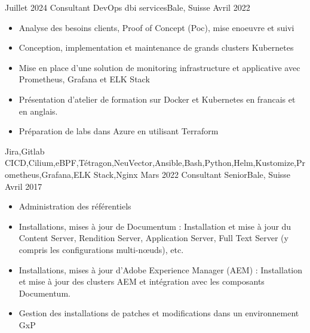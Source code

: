 %
%
%

\begin{experiences}
  \experience
    {Juillet 2024}   {Consultant DevOps }{dbi services}{Bale, Suisse}
    {Avril 2022} {
                      \begin{itemize}
                        \item Analyse des besoins clients, Proof of Concept (Poc), mise enoeuvre et suivi
                        \item Conception, implementation et maintenance de grands clusters Kubernetes
                        \item Mise en place d'une solution de monitoring infrastructure et applicative avec Prometheus, Grafana et ELK Stack
                        \item Présentation d’atelier de formation sur Docker et Kubernetes en francais et en anglais.
                        \item Préparation de labs dans Azure en utilisant Terraform 
                      \end{itemize}
                    }
                    {Jira,Gitlab CICD,Cilium,eBPF,Tétragon,NeuVector,Ansible,Bash,Python,Helm,Kustomize,Prometheus,Grafana,ELK Stack,Nginx}
  \emptySeparator
  \experience
    {Mars 2022} {Consultant Senior}{}{Bale, Suisse}
    {Avril 2017}    {
                      \begin{itemize}
                        \item Administration des référentiels                           
                        \item Installations, mises à jour de Documentum : Installation et mise à jour du Content Server, Rendition Server, Application Server, Full Text Server (y compris les configurations multi-nœuds), etc.                        
                        \item Installations, mises à jour d'Adobe Experience Manager (AEM) : Installation et mise à jour des clusters AEM et intégration avec les composants Documentum.  
                        \item Gestion des installations de patches et modifications dans un environnement GxP                

\end{itemize}}
\end{experiences}
